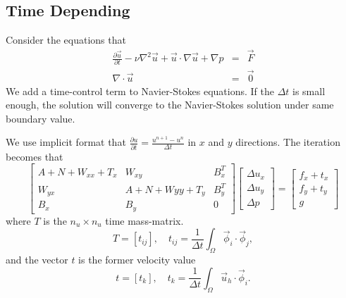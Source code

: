 \documentclass[a4paper]{article}
\begin{document}
\subsection{Time Depending}
Consider the equations that
\begin{equation}
\begin{array}{rcl}
\frac{\partial\vec{u}}{\partial t}-\nu \nabla^2 \vec{u} + \vec{u}\cdot \nabla \vec{u} + \nabla p &=& \vec{F} \\
\nabla \cdot \vec{u} &=& \vec{0}
\label{eq::Timedepending-problem}
\end{array}
\end{equation}
We add a time-control term to Navier-Stokes equations. If the $\Delta t$ is small enough, the solution will converge to the Navier-Stokes solution under same boundary value.


We use implicit format that $\frac{\partial u}{\partial t} = \frac{u^{n+1}-u^{n}}{\Delta t}$ in $x$ and $y$ directions.
The iteration becomes that
\begin{equation}
\left[ \begin{array}{ccc}
A + N +W_{xx} + T_x & W_{xy} & B_x^T \\
W_{yx} & A +N +W{yy} + T_y& B_y^T \\
B_x & B_y & 0
\end{array}
\right]
\left[\begin{array}{ccc}
\Delta u_x\\
\Delta u_y\\
\Delta p
\end{array}
\right]=
\left[\begin{array}{ccc}
f_x + t_x\\
f_y + t_y\\
g
\end{array}
\right]
\label{Timedepending}
\end{equation}
where $T$ is the $n_u\times n_u$ time mass-matrix.
\begin{equation}
T = [t_{ij}],\quad t_{ij}=\frac{1}{\Delta t}\int_{\Omega}\vec{\phi}_i\cdot\vec{\phi}_j,
\end{equation}
and the vector $t$ is the former velocity value
\begin{equation}
t = [t_{k}],\quad t_{k}=\frac{1}{\Delta t}\int_{\Omega}\vec{u}_h\cdot\vec{\phi}_i.
\end{equation}
\\
\end{document}
